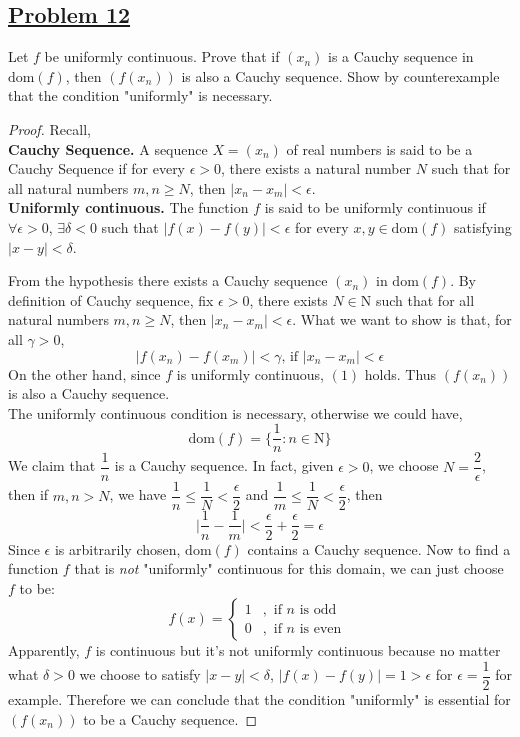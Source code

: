 \documentclass[10pt,letterpaper]{article}
\begin{document}
	\subsection*{{\color{purple}\underline{Problem 12}}}
	Let $f$ be uniformly continuous. Prove that if $(x_n)$ is a Cauchy sequence in 
	$\mathrm{dom}(f)$, 
	then $(f(x_n))$ is also a Cauchy sequence. Show by counterexample that the condition 
	"uniformly" is necessary.
	\begin{proof}
	Recall, \\
	\textbf{Cauchy Sequence. } A sequence $X = (x_n)$ of real numbers is said to be
	a Cauchy Sequence if for every $\epsilon > 0$, there exists a natural number $N$
	such that for all natural numbers $m, n \geq N$, then $|x_n - x_m| < \epsilon$. \\
	
	\textbf{Uniformly continuous. } The function $f$ is said to be uniformly continuous if
	$\forall \epsilon > 0$, $\exists \delta < 0$ such that $|f(x) - f(y)| < \epsilon$
	for every $x, y \in \mathrm{dom}(f)$ satisfying $|x - y| < \delta$. 
	
	From the hypothesis there exists a Cauchy sequence $(x_n)$ in $\mathrm{dom}(f)$.
	By definition of Cauchy sequence, fix $\epsilon > 0$, there exists $N \in \mathrm{N}$
	such that for all natural numbers $m, n \geq N$, then $|x_n - x_m| < \epsilon$.
	What we want to show is that, for all $\gamma > 0$,
	\begin{equation}
		|f(x_n) - f(x_m)| < \gamma \text{,   if } |x_n - x_m| < \epsilon 
	\end{equation}
	On the other hand, since $f$ is uniformly continuous, $(1)$ holds. Thus
	$(f(x_n))$ is also a Cauchy sequence. \\
	The uniformly continuous condition is necessary, otherwise we could have,
	$$\mathrm{dom}(f) = \{\dfrac{1}{n}: n \in \mathrm{N}\}$$
	We claim that $\dfrac{1}{n}$ is a Cauchy sequence. In fact, given $\epsilon > 0$,
	we choose $N = \dfrac{2}{\epsilon}$, then if $m, n > N$, we have
	$\dfrac{1}{n} \leq \dfrac{1}{N} < \dfrac{\epsilon}{2}$ and 
	$\dfrac{1}{m} \leq \dfrac{1}{N} < \dfrac{\epsilon}{2}$, then
	$$\bigg|\dfrac{1}{n} - \dfrac{1}{m}\bigg| < \dfrac{\epsilon}{2} + \dfrac{\epsilon}{2} = \epsilon$$
	Since $\epsilon$ is arbitrarily chosen, $\mathrm{dom}(f)$ contains a Cauchy sequence.
	Now to find a function $f$ that is \emph{not} "uniformly" continuous for this domain, we can just choose
	$f$ to be:
	$$
	f(x) = 
	\begin{cases}
		1 &, \text{ if } n \text{ is odd } \\
		0 &, \text{ if } n \text{ is even }
	\end{cases}
	$$
	Apparently, $f$ is continuous but it's not uniformly continuous because no matter what
	$\delta > 0$ we choose to satisfy $|x - y| < \delta$, $|f(x) - f(y)| = 1 > \epsilon$ for $\epsilon = \dfrac{1}{2}$ for example. Therefore we can conclude that the condition "uniformly" is essential 
	for $(f(x_n))$ to be a Cauchy sequence.
	\end{proof}
	
\end{document}
